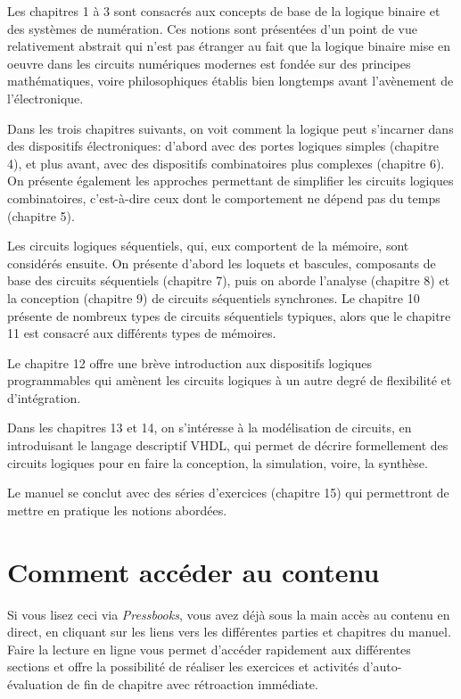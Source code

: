 \documentclass[letter, oneside]{book}
\begin{document}
Les chapitres 1 à 3 sont consacrés aux concepts de base de la logique
binaire et des systèmes de numération. Ces notions sont présentées
d'un point de vue relativement abstrait qui n'est pas étranger au fait
que la logique binaire mise en oeuvre dans les circuits numériques
modernes est fondée sur des principes mathématiques, voire
philosophiques établis bien longtemps avant l'avènement de
l'électronique.

Dans les trois chapitres suivants, on voit comment la logique peut
s'incarner dans des dispositifs électroniques: d'abord avec des portes
logiques simples (chapitre 4), et plus avant, avec des dispositifs
combinatoires plus complexes (chapitre 6). On présente également les
approches permettant de simplifier les circuits logiques
combinatoires, c'est-à-dire ceux dont le comportement ne dépend pas du
temps (chapitre 5).

Les circuits logiques séquentiels, qui, eux comportent de la
mémoire, sont considérés ensuite. On présente d'abord les loquets et
bascules, composants de base des circuits séquentiels (chapitre 7),
puis on aborde l'analyse (chapitre 8) et la conception (chapitre 9) de
circuits séquentiels synchrones. Le chapitre 10 présente de nombreux
types de circuits séquentiels typiques, alors que le chapitre 11 est
consacré aux différents types de mémoires.

Le chapitre 12 offre une brève introduction aux dispositifs logiques
programmables qui amènent les circuits logiques à un autre degré de
flexibilité et d'intégration.

Dans les chapitres 13 et 14, on s'intéresse à la modélisation de
circuits, en introduisant le langage descriptif VHDL, qui permet de
décrire formellement des circuits logiques pour en faire la
conception, la simulation, voire, la synthèse.

Le manuel se conclut avec des séries d'exercices (chapitre 15) qui
permettront de mettre en pratique les notions abordées.

\section*{Comment accéder au contenu}
\label{sec:org302fc89}

Si vous lisez ceci via \emph{Pressbooks}, vous avez déjà sous la main accès
au contenu en direct, en cliquant sur les liens vers les différentes
parties et chapitres du manuel. Faire la lecture en ligne vous permet
d'accéder rapidement aux différentes sections et offre la possibilité
de réaliser les exercices et activités d'auto-évaluation de fin de
chapitre avec rétroaction immédiate.
\end{document}
